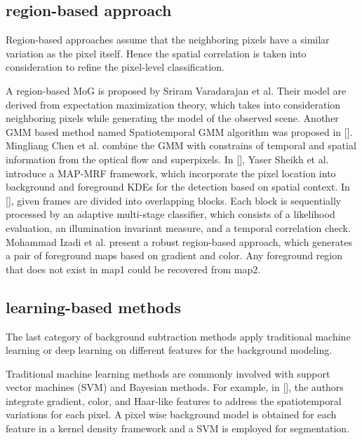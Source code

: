 \documentclass[journal]{IEEEtran}
\begin{document}
\subsection{region-based approach}
Region-based approaches assume that the neighboring pixels have a similar variation as the pixel itself. Hence the spatial correlation is taken into consideration to refine the pixel-level classification.

A region-based MoG is proposed by Sriram Varadarajan et al. Their model are derived from expectation maximization theory, which takes into consideration neighboring pixels while generating the model of the observed scene.
Another GMM based method named Spatiotemporal GMM algorithm was proposed in []. Mingliang Chen et al. combine the GMM with constrains of temporal and spatial information from the optical flow and superpixels.
In [], Yaser Sheikh et al. introduce a MAP-MRF framework, which incorporate the pixel location into background and foreground KDEs for the detection based on spatial context.
In [], given frames are divided into overlapping blocks. Each block is sequentially processed by an adaptive multi-stage classifier, which consists of a likelihood evaluation, an illumination invariant measure, and a temporal correlation check.
Mohammad Izadi et al. present a robust region-based approach, which generates a pair of foreground maps based on gradient and color. Any foreground region that does not exist in map1 could be recovered from map2.
\subsection{learning-based methods}
The last category of background subtraction methods apply traditional machine learning or deep learning on different features for the background modeling.

Traditional machine learning methods are commonly involved with support vector machines (SVM) and Bayesian methods. For example, in [], the authors integrate gradient, color, and Haar-like features to address the spatiotemporal variations for each pixel. A pixel wise background model is obtained for each feature in a kernel density framework and a SVM is employed for segmentation.
\end{document}
